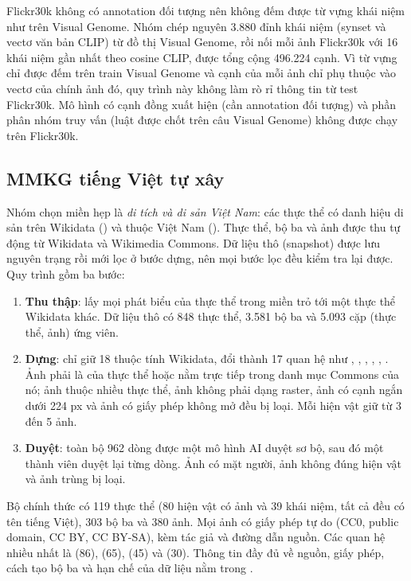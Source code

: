 Flickr30k không có annotation đối tượng nên không đếm được từ vựng khái niệm như trên Visual Genome. Nhóm chép nguyên 3.880 đỉnh khái niệm (synset và vectơ văn bản CLIP) từ đồ thị Visual Genome, rồi nối mỗi ảnh Flickr30k với 16 khái niệm gần nhất theo cosine CLIP, được tổng cộng 496.224 cạnh. Vì từ vựng chỉ được đếm trên train Visual Genome và cạnh của mỗi ảnh chỉ phụ thuộc vào vectơ của chính ảnh đó, quy trình này không làm rò rỉ thông tin từ test Flickr30k. Mô hình có cạnh đồng xuất hiện (cần annotation đối tượng) và phần phân nhóm truy vấn (luật được chốt trên câu Visual Genome) không được chạy trên Flickr30k.

\subsection{MMKG tiếng Việt tự xây}
\label{sec:mmkg-data}
Nhóm chọn miền hẹp là \emph{di tích và di sản Việt Nam}: các thực thể có danh hiệu di sản trên Wikidata () và thuộc Việt Nam (). Thực thể, bộ ba và ảnh được thu tự động từ Wikidata và Wikimedia Commons. Dữ liệu thô (snapshot) được lưu nguyên trạng rồi mới lọc ở bước dựng, nên mọi bước lọc đều kiểm tra lại được. Quy trình gồm ba bước:
\begin{enumerate}
\item \textbf{Thu thập}: lấy mọi phát biểu của thực thể trong miền trỏ tới một thực thể Wikidata khác. Dữ liệu thô có 848 thực thể, 3.581 bộ ba và 5.093 cặp (thực thể, ảnh) ứng viên.
\item \textbf{Dựng}: chỉ giữ 18 thuộc tính Wikidata, đổi thành 17 quan hệ như , , , , , . Ảnh phải là  của thực thể hoặc nằm trực tiếp trong danh mục Commons của nó; ảnh thuộc nhiều thực thể, ảnh không phải dạng raster, ảnh có cạnh ngắn dưới 224 px và ảnh có giấy phép không mở đều bị loại. Mỗi hiện vật giữ từ 3 đến 5 ảnh.
\item \textbf{Duyệt}: toàn bộ 962 dòng được một mô hình AI duyệt sơ bộ, sau đó một thành viên duyệt lại từng dòng. Ảnh có mặt người, ảnh không đúng hiện vật và ảnh trùng bị loại.
\end{enumerate}
Bộ chính thức có 119 thực thể (80 hiện vật có ảnh và 39 khái niệm, tất cả đều có tên tiếng Việt), 303 bộ ba và 380 ảnh. Mọi ảnh có giấy phép tự do (CC0, public domain, CC BY, CC BY-SA), kèm tác giả và đường dẫn nguồn. Các quan hệ nhiều nhất là  (86),  (65),  (45) và  (30). Thông tin đầy đủ về nguồn, giấy phép, cách tạo bộ ba và hạn chế của dữ liệu nằm trong .

